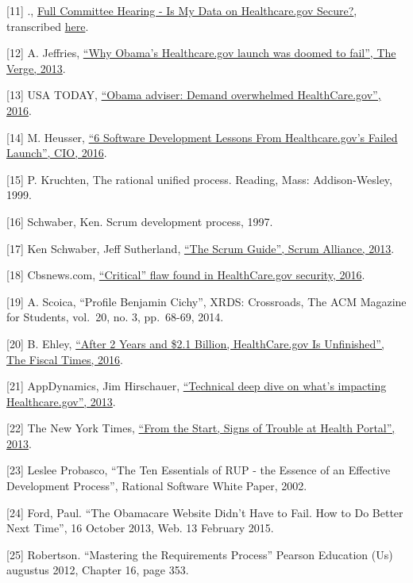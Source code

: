 \documentclass[]{article}
\begin{document}
{[}11{]} .,
\href{https://science.house.gov/legislation/hearings/full-committee-hearing-my-data-healthcaregov-secure}{Full
Committee Hearing - Is My Data on Healthcare.gov Secure?}, transcribed
\href{https://www.gpo.gov/fdsys/pkg/CHRG-113hhrg86893/pdf/CHRG-113hhrg86893.pdf}{here}.

{[}12{]} A. Jeffries,
\href{http://www.theverge.com/2013/10/8/4814098/why-did-the-tech-savvy-obama-administration-launch-a-busted-healthcare-website}{``Why
Obama's Healthcare.gov launch was doomed to fail'', The Verge, 2013}.

{[}13{]} USA TODAY,
\href{http://www.usatoday.com/story/news/nation/2013/10/05/health-care-website-repairs/2927597/}{``Obama
adviser: Demand overwhelmed HealthCare.gov'', 2016}.

{[}14{]} M. Heusser,
\href{http://www.cio.com/article/2380827/developer/developer-6-software-development-lessons-from-healthcare-gov-s-failed-launch.html}{``6
Software Development Lessons From Healthcare.gov's Failed Launch'', CIO,
2016}.

{[}15{]} P. Kruchten, The rational unified process. Reading, Mass:
Addison-Wesley, 1999.

{[}16{]} Schwaber, Ken. Scrum development process, 1997.

{[}17{]} Ken Schwaber, Jeff Sutherland,
\href{http://www.scrumguides.org/docs/scrumguide/v1/scrum-guide-us.pdf}{``The
Scrum Guide'', Scrum Alliance, 2013}.

{[}18{]} Cbsnews.com,
\href{http://www.cbsnews.com/news/critical-flaw-found-in-healthcare-gov-security/}{``Critical''
flaw found in HealthCare.gov security, 2016}.

{[}19{]} A. Scoica, ``Profile Benjamin Cichy'', XRDS: Crossroads, The
ACM Magazine for Students, vol.~20, no. 3, pp.~68-69, 2014.

{[}20{]} B. Ehley,
\href{http://www.thefiscaltimes.com/2015/03/05/After-2-Years-and-21-Billion-HealthCaregov-Unfinished}{``After
2 Years and \$2.1 Billion, HealthCare.gov Is Unfinished'', The Fiscal
Times, 2016}.

{[}21{]} AppDynamics, Jim Hirschauer,
\href{http://www.appdynamics.com/blog/apm/technical-deep-dive-whats-impacting-healthcare-gov/}{``Technical
deep dive on what's impacting Healthcare.gov'', 2013}.

{[}22{]} The New York Times,
\href{http://www.nytimes.com/2013/10/13/us/politics/from-the-start-signs-of-trouble-at-health-portal.html}{``From
the Start, Signs of Trouble at Health Portal'', 2013}.

{[}23{]} Leslee Probasco, ``The Ten Essentials of RUP - the Essence of
an Effective Development Process'', Rational Software White Paper, 2002.

{[}24{]} Ford, Paul. ``The Obamacare Website Didn't Have to Fail. How to
Do Better Next Time'', 16 October 2013, Web. 13 February 2015.

{[}25{]} Robertson. ``Mastering the Requirements Process'' Pearson
Education (Us) augustus 2012, Chapter 16, page 353.
\end{document}
